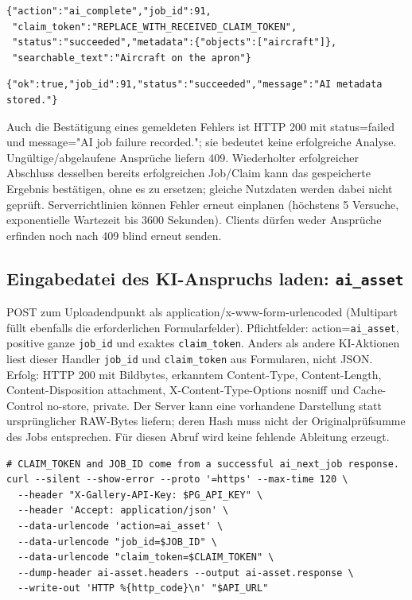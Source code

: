 \documentclass[11pt,a4paper]{article}
\newcommand{\codeword}[1]{\nolinkurl{#1}}
\begin{document}
\begin{lstlisting}[language={}]
{"action":"ai_complete","job_id":91,
 "claim_token":"REPLACE_WITH_RECEIVED_CLAIM_TOKEN",
 "status":"succeeded","metadata":{"objects":["aircraft"]},
 "searchable_text":"Aircraft on the apron"}
\end{lstlisting}

\begin{lstlisting}[language={}]
{"ok":true,"job_id":91,"status":"succeeded","message":"AI metadata stored."}
\end{lstlisting}

Auch die Bestätigung eines gemeldeten Fehlers ist HTTP 200 mit status=failed und message="AI
job failure recorded."; sie bedeutet keine erfolgreiche Analyse. Ungültige/abgelaufene
Ansprüche liefern 409. Wiederholter erfolgreicher Abschluss desselben bereits erfolgreichen
Job/Claim kann das gespeicherte Ergebnis bestätigen, ohne es zu ersetzen; gleiche Nutzdaten
werden dabei nicht geprüft. Serverrichtlinien können Fehler erneut einplanen (höchstens 5
Versuche, exponentielle Wartezeit bis 3600 Sekunden). Clients dürfen weder Ansprüche
erfinden noch nach 409 blind erneut senden.

\subsection{\texorpdfstring{Eingabedatei des KI-Anspruchs laden: \codeword{ai_asset}}{Eingabedatei des KI-Anspruchs laden: ai\_asset}}

\label{api352:ai-asset}

POST zum Uploadendpunkt als application/x-www-form-urlencoded (Multipart füllt ebenfalls die
erforderlichen Formularfelder). Pflichtfelder: action=\codeword{ai_asset}, positive ganze
\codeword{job_id} und exaktes \codeword{claim_token}. Anders als andere KI-Aktionen liest
dieser Handler \codeword{job_id} und \codeword{claim_token} aus Formularen, nicht JSON.
Erfolg: HTTP 200 mit Bildbytes, erkanntem Content-Type, Content-Length, Content-Disposition
attachment, X-Content-Type-Options nosniff und Cache-Control no-store, private. Der Server
kann eine vorhandene Darstellung statt ursprünglicher RAW-Bytes liefern; deren Hash muss
nicht der Originalprüfsumme des Jobs entsprechen. Für diesen Abruf wird keine fehlende
Ableitung erzeugt.

\begin{lstlisting}[language={}]
# CLAIM_TOKEN and JOB_ID come from a successful ai_next_job response.
curl --silent --show-error --proto '=https' --max-time 120 \
  --header "X-Gallery-API-Key: $PG_API_KEY" \
  --header 'Accept: application/json' \
  --data-urlencode 'action=ai_asset' \
  --data-urlencode "job_id=$JOB_ID" \
  --data-urlencode "claim_token=$CLAIM_TOKEN" \
  --dump-header ai-asset.headers --output ai-asset.response \
  --write-out 'HTTP %{http_code}\n' "$API_URL"
\end{lstlisting}
\end{document}
